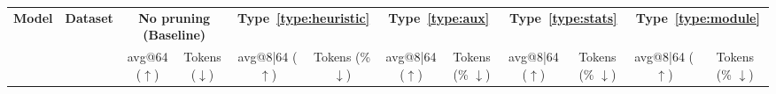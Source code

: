 \documentclass[11pt]{article}
\theoremstyle{plain}
\begin{document}
\begin{table}[ht!]
{\begin{tabular}{llcc cc cc cc cc}

\multirow{2}{*}{\textbf{Model}} & \multirow{2}{*}{\textbf{Dataset}} 
& \multicolumn{2}{c}{\textbf{No pruning (Baseline)}} 
& \multicolumn{2}{c}{\textbf{Type~\ref{type:heuristic} }} 
& \multicolumn{2}{c}{\textbf{Type~\ref{type:aux}}} 
& \multicolumn{2}{c}{\textbf{Type~\ref{type:stats}}} 
& \multicolumn{2}{c}{\textbf{Type~\ref{type:module}}} \\
\cmidrule(lr){3-4} \cmidrule(lr){5-6} \cmidrule(lr){7-8} \cmidrule(lr){9-10}\cmidrule(lr){11-12}
& & avg@64 ($\uparrow$) & Tokens ($\downarrow$)  & avg@8|64 ($\uparrow$) & Tokens (\% $\downarrow$) & avg@8|64 ($\uparrow$) & Tokens (\% $\downarrow$) & avg@8|64 ($\uparrow$) & Tokens (\% $\downarrow$)& avg@8|64 ($\uparrow$) & Tokens (\% $\downarrow$) \\


\end{tabular}}
\end{table}
\end{document}
